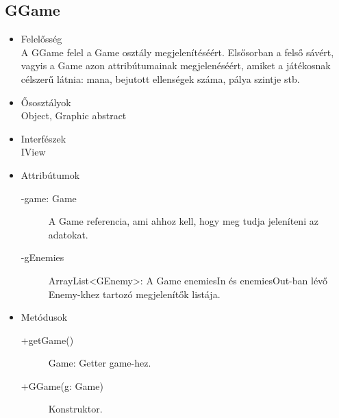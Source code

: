 \subsection{GGame}
\begin{itemize}
\item Felelősség\\
A GGame felel a Game osztály megjelenítéséért. Elsősorban a felső sávért, vagyis a Game azon attribútumainak megjelenéséért, amiket a játékosnak célszerű látnia: mana, bejutott ellenségek száma, pálya szintje stb. 
\item Ősosztályok\\
Object, Graphic abstract
\item Interfészek\\
IView
\item Attribútumok\\
	\begin{description}
		\item[-game: Game] A Game referencia, ami ahhoz kell, hogy meg tudja jeleníteni az adatokat.
		\item[-gEnemies] ArrayList<GEnemy>: A Game enemiesIn és enemiesOut-ban lévő Enemy-khez tartozó megjelenítők listája. 
\end{description}
\item Metódusok\\
	\begin{description}
		\item[+getGame()] Game: Getter game-hez.
		\item[+GGame(g: Game)] Konstruktor.
	\end{description}
\end{itemize}

